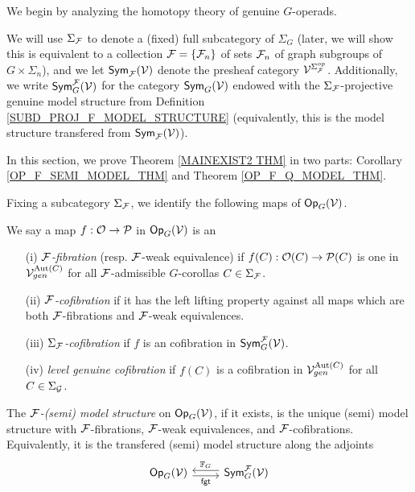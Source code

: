 \documentclass[a4paper,10pt]{article}%
\begin{document}
We begin by analyzing the homotopy theory of genuine $G$-operads. 

\begin{notation}
  We will use $\Sigma_{\mathcal F}$ to denote a (fixed) full subcategory of $\Sigma_G$ (later, we will show this is equivalent to a collection $\mathcal F = \left\{\mathcal F_n\right\}$ of sets $\mathcal F_n$ of graph subgroups of $G\times \Sigma_n$), and we let $\mathsf{Sym}_{\mathcal F}(\mathcal V)$ denote the presheaf category $\mathcal V^{\Sigma_{\mathcal F}^{op}}$. 
  Additionally, we write $\mathsf{Sym}_G^{\mathcal F}(\mathcal V)$ for the category $\mathsf{Sym}_G(\mathcal V)$ endowed with the $\Sigma_{\mathcal F}$-projective genuine model structure from Definition \ref{SUBD_PROJ_F_MODEL_STRUCTURE} (equivalently, this is the model structure transfered from $\mathsf{Sym}_{\mathcal F}(\mathcal V)$).
\end{notation}





In this section, we prove Theorem \ref{MAINEXIST2 THM} in two parts: Corollary \ref{OP_F_SEMI_MODEL_THM} and Theorem \ref{OP_F_Q_MODEL_THM}.

Fixing a subcategory $\Sigma_{\mathcal F}$, we identify the following maps of $\mathsf{Op}_G(\mathcal V)$.
\begin{definition} 
  We say a map $f: \mathcal{O} \to \mathcal{P}$ in $\mathsf{Op}_G(\mathcal V)$ is an  
  \begin{itemize} 
  \item[(i)] \textit{$\mathcal F$-fibration} (resp. $\mathcal F$-weak equivalence) if $f(C):\mathcal{O}(C) \to \mathcal{P}(C)$ is one in $\mathcal V^{\mathrm{Aut}(C)}_{gen}$ for all $\mathcal F$-admissible $G$-corollas $C\in\Sigma_{\mathcal F}$. 
  \item[(ii)] \textit{$\mathcal F$-cofibration} if it has the left lifting property against all maps which are both $\mathcal F$-fibrations and $\mathcal F$-weak equivalences. 
  \item[(iii)] \textit{$\Sigma_{\mathcal F}$-cofibration} if $f$ is an cofibration in $\mathsf{Sym}_G^{\mathcal F}(\mathcal V)$. 
  \item[(iv)] \textit{level genuine cofibration} if $f(C)$ is a cofibration in $\mathcal V^{\mathrm{Aut}(C)}_{gen}$ for all $C\in \Sigma_{\mathcal{G}}$. 
  \end{itemize} 
\end{definition} 


\begin{definition} 
  The \textit{$\mathcal F$-(semi) model structure} on $\mathsf{Op}_G(\mathcal V)$, if it exists, is the unique (semi) model structure with $\mathcal F$-fibrations, $\mathcal F$-weak equivalences, and $\mathcal F$-cofibrations. Equivalently, it is the transfered (semi) model structure along the adjoints 
  \[ 
  \begin{tikzcd} 
    \Op_G(\V) \arrow[r, shift right, "\mathsf{fgt}"'] & \Sym_G^\F(\V) \arrow[l, shift right, "\mathbb F_G"']
  \end{tikzcd} 
  \] 
\end{definition} 
\end{document}
